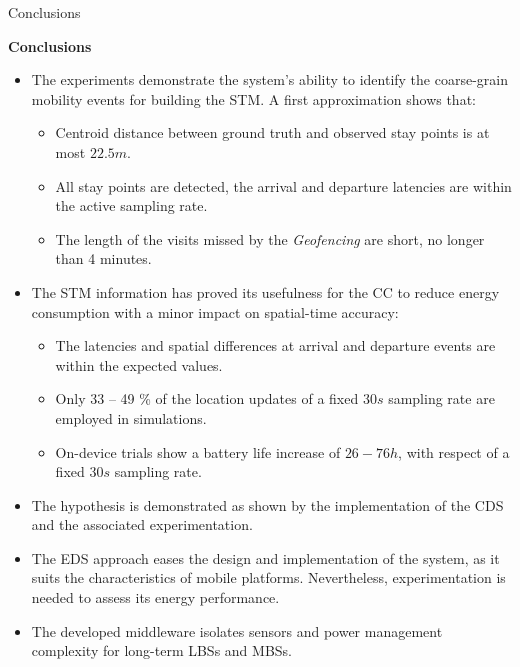 \begin{frame}{Conclusions}{}
\small 
\begin{block}{\small \textbf{Conclusions}}
\begin{itemize}
  \item The experiments demonstrate the system's ability to identify the coarse-grain mobility events for building the STM. A first approximation shows that:%
  \begin{itemize}
  	\item Centroid distance between ground truth and observed stay points is at most $22.5 m$.
  	\item All stay points are detected, the arrival and departure latencies are within the active sampling rate.
  	\item The length of the visits missed by the \emph{Geofencing} are short, no longer than 4 minutes.
  \end{itemize}
  
  \item The STM information has proved its usefulness for the CC to reduce energy consumption with a minor impact on spatial-time accuracy: %

  \begin{itemize}
  	\item The latencies and spatial differences at arrival and departure events are within the expected values.
  	\item Only 33 – 49 \% of the location updates of a fixed $30 s$ sampling rate are employed in simulations.
  	\item On-device trials show a battery life increase of $26 - 76 h$, with respect of a fixed $30 s$ sampling rate.
  \end{itemize}

  \item The hypothesis is demonstrated as shown by the implementation of the CDS and the associated experimentation. %
  \item The EDS approach eases the design and implementation of the system, as it suits the characteristics of mobile platforms. Nevertheless, experimentation is needed to assess its energy performance.
  \item The developed middleware isolates sensors and power management complexity for long-term LBSs and MBSs.
\end{itemize}
\end{block}

\end{frame}



